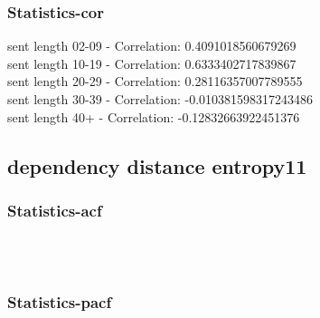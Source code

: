 \documentclass{article}%
\begin{document}
%
\newpage%
\subsubsection{Statistics{-}cor}%
\label{ssubsec:Statistics{-}cor}%
\noindent%
sent length 02-09 - Correlation: 0.4091018560679269\\%
sent length 10-19 - Correlation: 0.6333402717839867\\%
sent length 20-29 - Correlation: 0.28116357007789555\\%
sent length 30-39 - Correlation: -0.010381598317243486\\%
sent length 40+ - Correlation: -0.12832663922451376\\

%
\newpage

%
\subsection{dependency distance entropy11}%
\label{subsec:dependencydistanceentropy11}%
\subsubsection{Statistics{-}acf}%
\label{ssubsec:Statistics{-}acf}%


\begin{figure}[ht]%
\centering%
\setlength{\abovecaptionskip}{-35pt}%
%
%
\\%
%
%
\\%
%
\end{figure}

%
\newpage%
\subsubsection{Statistics{-}pacf}%
\label{ssubsec:Statistics{-}pacf}%
\end{document}
